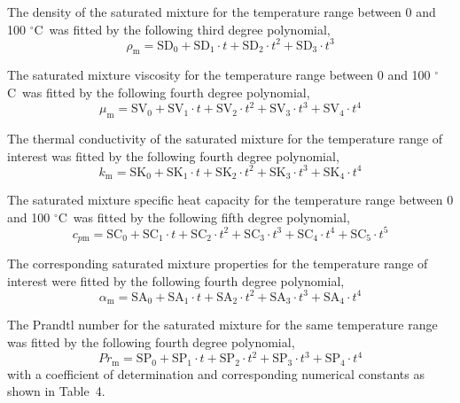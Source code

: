 \documentclass[11pt]{article}
\newcommand{\degC}{$^{\circ}$C}
\begin{document}
\noindent The density of the saturated mixture for the temperature
range between 0 and 100 \degC\ was fitted by the following third
degree polynomial,
\begin{equation}
\rho_\mathrm{m} = \mathrm{SD}_0 + \mathrm{SD}_1\cdot t
  + \mathrm{SD}_2\cdot t^{2} + \mathrm{SD}_3\cdot t^{3}
\end{equation}

\noindent The saturated mixture viscosity for the temperature range
between 0 and 100 \degC\ was fitted by the following fourth degree
polynomial,
\begin{equation}
\mu_\mathrm{m} = \mathrm{SV}_0 + \mathrm{SV}_1\cdot t
  + \mathrm{SV}_2\cdot t^{2} + \mathrm{SV}_3\cdot t^{3}
  + \mathrm{SV}_4\cdot t^{4}
\end{equation}

\noindent The thermal conductivity of the saturated mixture for the
temperature range of interest was fitted by the following fourth
degree polynomial,
\begin{equation}
k_\mathrm{m} = \mathrm{SK}_0 + \mathrm{SK}_1\cdot t
  + \mathrm{SK}_2\cdot t^{2} + \mathrm{SK}_3\cdot t^{3}
  + \mathrm{SK}_4\cdot t^{4}
\end{equation}

\noindent The saturated mixture specific heat capacity for the
temperature range between 0 and 100 \degC\ was fitted by the following
fifth degree polynomial,
\begin{equation}
c_{p\mathrm{m}} = \mathrm{SC}_0 + \mathrm{SC}_1\cdot t
  + \mathrm{SC}_2\cdot t^{2} + \mathrm{SC}_3\cdot t^{3}
  + \mathrm{SC}_4\cdot t^{4} + \mathrm{SC}_5\cdot t^{5}
\end{equation}

\noindent The corresponding saturated mixture properties for the
temperature range of interest were fitted by the following fourth
degree polynomial,
\begin{equation}
\alpha_\mathrm{m} = \mathrm{SA}_0 + \mathrm{SA}_1\cdot t
  + \mathrm{SA}_2\cdot t^{2} + \mathrm{SA}_3\cdot t^{3}
  + \mathrm{SA}_4\cdot t^{4}
\end{equation}

\noindent The Prandtl number for the saturated mixture for the same
temperature range was fitted by the following fourth degree
polynomial,
\begin{equation}
Pr_\mathrm{m} = \mathrm{SP}_0 + \mathrm{SP}_1\cdot t
  + \mathrm{SP}_2\cdot t^{2} + \mathrm{SP}_3\cdot t^{3}
  + \mathrm{SP}_4\cdot t^{4}
\end{equation}
with a coefficient of determination and corresponding numerical
constants as shown in Table~4.
\end{document}
